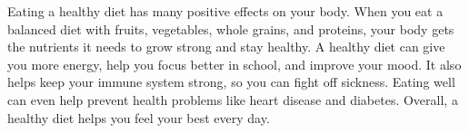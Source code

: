 \documentclass[12pt]{article}
\begin{document}
\begin{tcolorbox}[colframe=black!60, colback=white, 
coltitle=black, colbacktitle=black!15, fonttitle=\bfseries\Large, 
title=Text: The Benefits of a Healthy Diet, halign title=center, left=10pt, right=10pt, top=10pt, bottom=15pt]


Eating a healthy diet has many positive effects on your body. When you eat a balanced diet with fruits, vegetables, whole grains, and proteins, your body gets the nutrients it needs to grow strong and stay healthy. A healthy diet can give you more energy, help you focus better in school, and improve your mood. It also helps keep your immune system strong, so you can fight off sickness. Eating well can even help prevent health problems like heart disease and diabetes. Overall, a healthy diet helps you feel your best every day.

 
\end{tcolorbox}


\vspace{1em}
\end{document}
